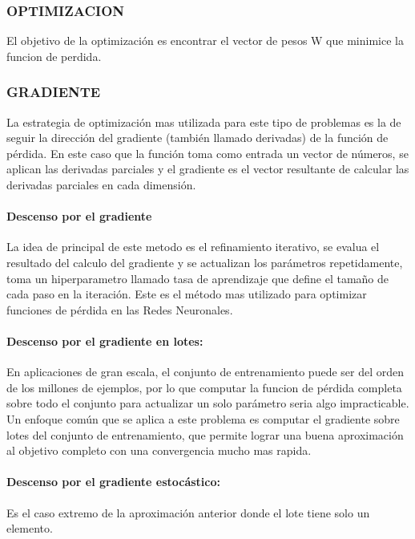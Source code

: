 \documentclass[a4paper,10pt]{article}
\begin{document}
    \subsubsection{OPTIMIZACION}
      El objetivo de la optimización es encontrar el vector de pesos W que minimice la funcion de perdida.

    \subsubsection{GRADIENTE} 
      La estrategia de optimización mas utilizada para este tipo de problemas es la de seguir la dirección del gradiente (también llamado derivadas) de la función de pérdida.
      En este caso que la función toma como entrada un vector de números, se aplican las derivadas parciales y el gradiente es el vector resultante de calcular las derivadas parciales
      en cada dimensión.

      \paragraph{Descenso por el gradiente}
	La idea de principal de este metodo es el refinamiento iterativo, se evalua el resultado del calculo del gradiente y se actualizan los parámetros repetidamente, 
	toma un hiperparametro llamado tasa de aprendizaje que define el tamaño de cada paso en la iteración.
	Este es el método mas utilizado para optimizar funciones de pérdida en las Redes Neuronales. 

      \paragraph{Descenso por el gradiente en lotes:} 
	En aplicaciones de gran escala, el conjunto de entrenamiento puede ser del orden de los millones de ejemplos, por lo que computar la funcion de 
	pérdida completa sobre todo el conjunto para actualizar un solo parámetro seria algo impracticable.
	Un enfoque común que se aplica a este problema es computar el gradiente sobre lotes del conjunto de entrenamiento, que permite lograr una buena aproximación al objetivo completo con
	una convergencia mucho mas rapida.

      \paragraph{Descenso por el gradiente estocástico:} 
	Es el caso extremo de la aproximación anterior donde el lote tiene solo un elemento.
\end{document}
